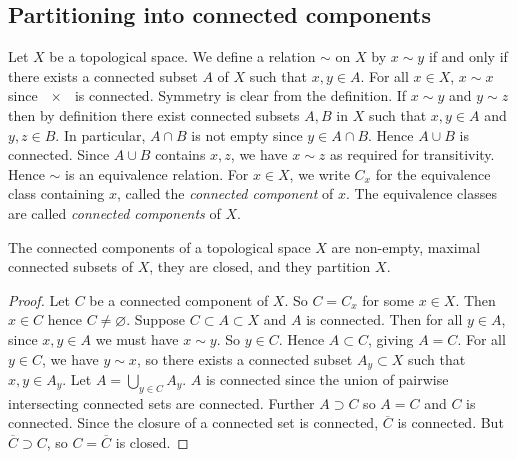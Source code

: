 \subsection{Partitioning into connected components}
\begin{definition}
	Let \( X \) be a topological space.
	We define a relation \( \sim \) on \( X \) by \( x \sim y \) if and only if there exists a connected subset \( A \) of \( X \) such that \( x, y \in A \).
	For all \( x \in X \), \( x \sim x \) since \( \qty{x} \) is connected.
	Symmetry is clear from the definition.
	If \( x \sim y \) and \( y \sim z \) then by definition there exist connected subsets \( A, B \) in \( X \) such that \( x, y \in A \) and \( y, z \in B \).
	In particular, \( A \cap B \) is not empty since \( y \in A \cap B \).
	Hence \( A \cup B \) is connected.
	Since \( A \cup B \) contains \( x, z \), we have \( x \sim z \) as required for transitivity.
	Hence \( \sim \) is an equivalence relation.
	For \( x \in X \), we write \( C_x \) for the equivalence class containing \( x \), called the \textit{connected component} of \( x \).
	The equivalence classes are called \textit{connected components} of \( X \).
\end{definition}
\begin{proposition}
	The connected components of a topological space \( X \) are non-empty, maximal connected subsets of \( X \), they are closed, and they partition \( X \).
\end{proposition}
\begin{proof}
	Let \( C \) be a connected component of \( X \).
	So \( C = C_x \) for some \( x \in X \).
	Then \( x \in C \) hence \( C \neq \varnothing \).
	Suppose \( C \subset A \subset X \) and \( A \) is connected.
	Then for all \( y \in A \), since \( x, y \in A \) we must have \( x \sim y \).
	So \( y \in C \).
	Hence \( A \subset C \), giving \( A = C \).
	For all \( y \in C \), we have \( y \sim x \), so there exists a connected subset \( A_y \subset X \) such that \( x, y \in A_y \).
	Let \( A = \bigcup_{y \in C} A_y \).
	\( A \) is connected since the union of pairwise intersecting connected sets are connected.
	Further \( A \supset C \) so \( A = C \) and \( C \) is connected.
	Since the closure of a connected set is connected, \( \overline C \) is connected.
	But \( \overline C \supset C \), so \( C = \overline C \) is closed.
\end{proof}

